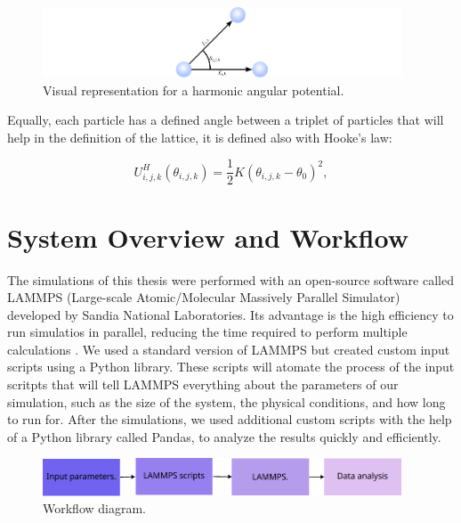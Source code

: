 \begin{figure}
  \begin{center}
    \includegraphics[width=0.95\textwidth]{figures/harmonicP.pdf}
  \end{center}
  \caption[Visual representation for a harmonic potential.]{Visual representation for a harmonic angular potential.}\label{fig:}
\end{figure}


Equally, each particle has a defined angle between a triplet of particles that will help in the definition of the lattice, it is defined also with Hooke's law:

\begin{equation}
  U^{H}_{i,j,k}(\theta _{i,j,k}) = \frac{1}{2}K(\theta_{i,j,k} - \theta_0)^2,
\end{equation}



\section{System Overview and Workflow}

The simulations of this thesis were performed with an open-source software called LAMMPS (Large-scale Atomic/Molecular Massively Parallel Simulator) developed by Sandia National Laboratories. Its advantage is the high efficiency to run simulatios in parallel, reducing the time required to perform multiple calculations \cite{LAMMPS}. We used a standard version of LAMMPS but created custom input scripts using a Python library. These scripts will atomate the process of the input scritpts that will tell LAMMPS everything about the parameters of our simulation, such as the size of the system, the physical conditions, and how long to run for. After the simulations, we used additional custom scripts with the help of a Python library called Pandas, to analyze the results quickly and efficiently.

\begin{figure}[h]
  \begin{center}
    \includegraphics[width=0.95\textwidth]{figures/workflow.pdf}
  \end{center}
  \caption[Workflow diagram.]{Workflow diagram.}\label{fig:workflow}
\end{figure}

